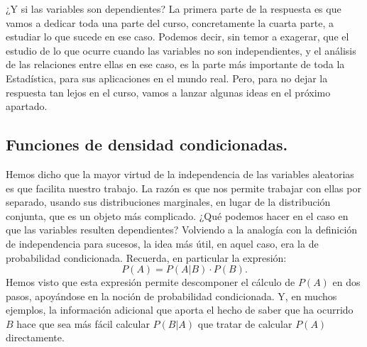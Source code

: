 ¿Y si las variables son dependientes? La primera parte de la respuesta es que vamos a dedicar toda una parte del curso, concretamente la cuarta parte, a estudiar lo que sucede en ese caso. Podemos decir, sin temor a exagerar, que el estudio de lo que ocurre cuando las variables no son independientes, y el análisis de las relaciones entre ellas en ese caso, es la parte más importante de toda la Estadística, para sus aplicaciones en el mundo real. Pero, para no dejar la respuesta tan lejos en el curso, vamos a lanzar algunas ideas en el próximo apartado.

\subsection{Funciones de densidad condicionadas.}
\label{cap04:subsec:FuncionesDensidadCondicionadasVectorAleatorio}

Hemos dicho que la mayor virtud de la independencia de las variables aleatorias es que facilita  nuestro trabajo. La razón es que nos permite trabajar con ellas por separado, usando sus distribuciones marginales, en lugar de la distribución conjunta, que es un objeto más complicado.
¿Qué podemos hacer en el caso en que las variables resulten dependientes? Volviendo a la analogía con la definición de independencia para sucesos, la idea más útil, en aquel caso, era la de probabilidad condicionada. Recuerda, en particular la expresión:
\[P(A) = P(A|B)\cdot P(B).\]
Hemos visto que esta expresión permite descomponer el cálculo de $P(A)$ en dos pasos, apoyándose en la noción de probabilidad condicionada. Y, en muchos ejemplos, la información adicional que aporta el hecho de saber que ha ocurrido $B$ hace que sea más fácil calcular $P(B|A)$ que tratar de calcular $P(A)$ directamente.

